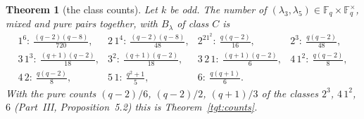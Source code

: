 \documentclass[12pt,a4paper]{amsart}
\newtheorem{theorem}{Theorem}[section]
\theoremstyle{definition}
\newcommand{\F}{\mathbb{F}}
\begin{document}
\begin{theorem}[the class counts]\label{thm:counts}
Let $k$ be odd. The number of $(\lambda_3,\lambda_5)\in\F_q\times\F_q^\times$, mixed and pure pairs together, with $B_\lambda$ of class $C$ is
\[
\begin{array}{llll}
1^6:\ \tfrac{(q-2)(q-8)}{720}, & 2\,1^4:\ \tfrac{(q-2)(q-8)}{48}, & 2^21^2:\ \tfrac{q(q-2)}{16}, & 2^3:\ \tfrac{q(q-2)}{48},\\[0.5ex]
3\,1^3:\ \tfrac{(q+1)(q-2)}{18}, & 3^2:\ \tfrac{(q+1)(q-2)}{18}, & 3\,2\,1:\ \tfrac{(q+1)(q-2)}{6}, & 4\,1^2:\ \tfrac{q(q-2)}{8},\\[0.5ex]
4\,2:\ \tfrac{q(q-2)}{8}, & 5\,1:\ \tfrac{q^2+1}{5}, & 6:\ \tfrac{q(q+1)}{6}. &
\end{array}
\]
With the pure counts $(q-2)/6$, $(q-2)/2$, $(q+1)/3$ of the classes $2^3$, $4\,1^2$, $6$ (Part~III, Proposition~5.2) this is Theorem~\ref{tgt:counts}.
\end{theorem}
\end{document}
